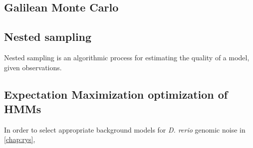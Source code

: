 \subsection{Galilean Monte Carlo}
\label{ssec:GMC}

\subsection{Nested sampling}
\label{ssec:nested}
Nested sampling is an algorithmic process for estimating the quality of a model, given observations. 

\subsection{Expectation Maximization optimization of HMMs}
\label{ssec:EM}
In order to select appropriate background models for \textit{D. rerio} genomic noise in \autoref{chap:rys}, 
